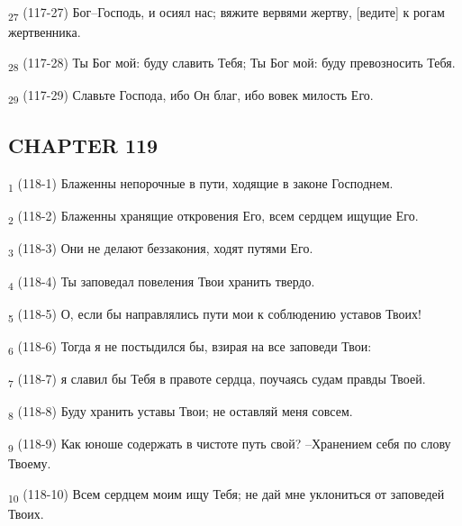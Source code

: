 \begin{tcolorbox}
\textsubscript{27} (117-27) Бог--Господь, и осиял нас; вяжите вервями жертву, [ведите] к рогам жертвенника.
\end{tcolorbox}
\begin{tcolorbox}
\textsubscript{28} (117-28) Ты Бог мой: буду славить Тебя; Ты Бог мой: буду превозносить Тебя.
\end{tcolorbox}
\begin{tcolorbox}
\textsubscript{29} (117-29) Славьте Господа, ибо Он благ, ибо вовек милость Его.
\end{tcolorbox}
\subsection{CHAPTER 119}
\begin{tcolorbox}
\textsubscript{1} (118-1) Блаженны непорочные в пути, ходящие в законе Господнем.
\end{tcolorbox}
\begin{tcolorbox}
\textsubscript{2} (118-2) Блаженны хранящие откровения Его, всем сердцем ищущие Его.
\end{tcolorbox}
\begin{tcolorbox}
\textsubscript{3} (118-3) Они не делают беззакония, ходят путями Его.
\end{tcolorbox}
\begin{tcolorbox}
\textsubscript{4} (118-4) Ты заповедал повеления Твои хранить твердо.
\end{tcolorbox}
\begin{tcolorbox}
\textsubscript{5} (118-5) О, если бы направлялись пути мои к соблюдению уставов Твоих!
\end{tcolorbox}
\begin{tcolorbox}
\textsubscript{6} (118-6) Тогда я не постыдился бы, взирая на все заповеди Твои:
\end{tcolorbox}
\begin{tcolorbox}
\textsubscript{7} (118-7) я славил бы Тебя в правоте сердца, поучаясь судам правды Твоей.
\end{tcolorbox}
\begin{tcolorbox}
\textsubscript{8} (118-8) Буду хранить уставы Твои; не оставляй меня совсем.
\end{tcolorbox}
\begin{tcolorbox}
\textsubscript{9} (118-9) Как юноше содержать в чистоте путь свой? --Хранением себя по слову Твоему.
\end{tcolorbox}
\begin{tcolorbox}
\textsubscript{10} (118-10) Всем сердцем моим ищу Тебя; не дай мне уклониться от заповедей Твоих.
\end{tcolorbox}
